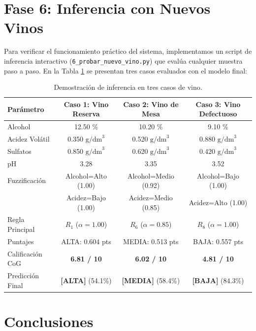 \documentclass[11pt,a4paper]{article}
\begin{document}
\section{Fase 6: Inferencia con Nuevos Vinos}

Para verificar el funcionamiento práctico del sistema, implementamos un script de inferencia interactivo (\texttt{6\_probar\_nuevo\_vino.py}) que evalúa cualquier muestra paso a paso. En la Tabla \ref{tab:ejemplos_inferencia} se presentan tres casos evaluados con el modelo final:

\begin{table}[H]
\centering
\caption{Demostración de inferencia en tres casos de vino.}
\label{tab:ejemplos_inferencia}
\small
\begin{tabular}{lccc}
\toprule
\textbf{Parámetro} & \textbf{Caso 1: Vino Reserva} & \textbf{Caso 2: Vino de Mesa} & \textbf{Caso 3: Vino Defectuoso} \\
\midrule
Alcohol & 12.50 \% & 10.20 \% & 9.10 \% \\
Acidez Volátil & 0.350 $\text{g/dm}^3$ & 0.520 $\text{g/dm}^3$ & 0.880 $\text{g/dm}^3$ \\
Sulfatos & 0.850 $\text{g/dm}^3$ & 0.620 $\text{g/dm}^3$ & 0.420 $\text{g/dm}^3$ \\
pH & 3.28 & 3.35 & 3.52 \\
\midrule
Fuzzificación & Alcohol=Alto (1.00) & Alcohol=Medio (0.92) & Alcohol=Bajo (1.00) \\
& Acidez=Bajo (1.00) & Acidez=Medio (0.85) & Acidez=Alto (1.00) \\
\midrule
Regla Principal & $R_1$ ($\alpha=1.00$) & $R_6$ ($\alpha=0.85$) & $R_8$ ($\alpha=1.00$) \\
\midrule
Puntajes & ALTA: 0.604 pts & MEDIA: 0.513 pts & BAJA: 0.557 pts \\
\midrule
Calificación CoG & \textbf{6.81 / 10} & \textbf{6.02 / 10} & \textbf{4.81 / 10} \\
Predicción Final & \textbf{[ALTA]} (54.1\%) & \textbf{[MEDIA]} (58.4\%) & \textbf{[BAJA]} (84.3\%) \\
\bottomrule
\end{tabular}
\end{table}

\section{Conclusiones}
\end{document}
